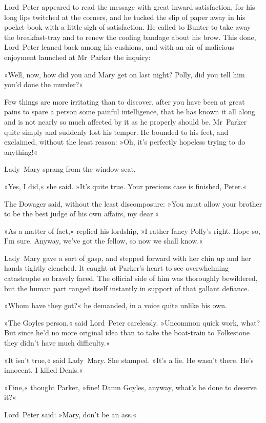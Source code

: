 Lord~Peter appeared to read the message with great inward satisfaction, for his long lips twitched at the corners, and he tucked the slip of paper away in his pocket-book with a little sigh of satisfaction. He called to Bunter to take away the breakfast-tray and to renew the cooling bandage about his brow. This done, Lord~Peter leaned back among his cushions, and with an air of malicious enjoyment launched at Mr~Parker the inquiry:

»Well, now, how did you and Mary get on last night? Polly, did you tell him you'd done the murder?«

Few things are more irritating than to discover, after you have been at great pains to spare a person some painful intelligence, that he has known it all along and is not nearly so much affected by it as he properly should be. Mr~Parker quite simply and suddenly lost his temper. He bounded to his feet, and exclaimed, without the least reason: »Oh, it's perfectly hopeless trying to do anything!«

Lady~Mary sprang from the window-seat.

»Yes, I did,« she said. »It's quite true. Your precious case is finished, Peter.«

The Dowager said, without the least discomposure: »You must allow your brother to be the best judge of his own affairs, my dear.«

»As a matter of fact,« replied his lordship, »I rather fancy Polly's right. Hope so, I'm sure. Anyway, we've got the fellow, so now we shall know.«

Lady~Mary gave a sort of gasp, and stepped forward with her chin up and her hands tightly clenched. It caught at Parker's heart to see overwhelming catastrophe so bravely faced. The official side of him was thoroughly bewildered, but the human part ranged itself instantly in support of that gallant defiance.

»Whom have they got?« he demanded, in a voice quite unlike his own.

»The Goyles person,« said Lord~Peter carelessly. »Uncommon quick work, what? But since he'd no more original idea than to take the boat-train to Folkestone they didn't have much difficulty.«

»It isn't true,« said Lady~Mary. She stamped. »It's a lie. He wasn't there. He's innocent. I killed Denis.«

»Fine,« thought Parker, »fine! Damn Goyles, anyway, what's he done to deserve it?«

Lord~Peter said: »Mary, don't be an ass.«

